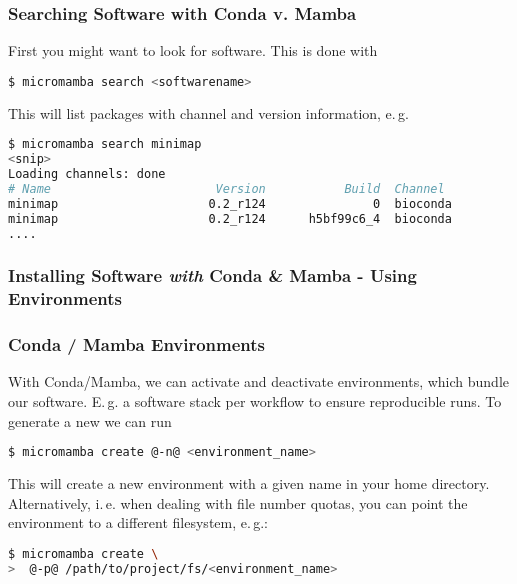 \begin{frame}[fragile]
  \frametitle{Searching Software with Conda v. Mamba}
  First you might want to look for software. This is done with
  \begin{lstlisting}[language=Bash, style=Shell]
$ micromamba search <softwarename>
  \end{lstlisting}
  \pause
  \pause
  This will list packages with channel and version information, e.\,g.
  \begin{lstlisting}[language=Bash, style=Shell, basicstyle=\tiny]
$ micromamba search minimap
<snip>
Loading channels: done
# Name                       Version           Build  Channel             
minimap                     0.2_r124               0  bioconda            
minimap                     0.2_r124      h5bf99c6_4  bioconda
....
  \end{lstlisting}
\end{frame}


\begin{frame}
  \frametitle{Installing Software \emph{with} Conda \& Mamba - Using Environments}
\end{frame}

\begin{frame}[fragile]
  \frametitle{Conda / Mamba Environments}
  With Conda/Mamba, we can activate and deactivate environments, which bundle our software. E.\,g. a software stack per workflow to ensure reproducible runs.
    \pause
  To generate a new we can run
  \begin{lstlisting}[language=Bash, style=Shell]
$ micromamba create @-n@ <environment_name>
  \end{lstlisting}
  This will create a new environment with a given name in your home directory. Alternatively, i.\,e. when dealing with file number quotas, you can point the environment to a different filesystem, e.\,g.:
  \begin{lstlisting}[language=Bash, style=Shell] 
$ micromamba create \
>  @-p@ /path/to/project/fs/<environment_name>
   \end{lstlisting}
\end{frame}

